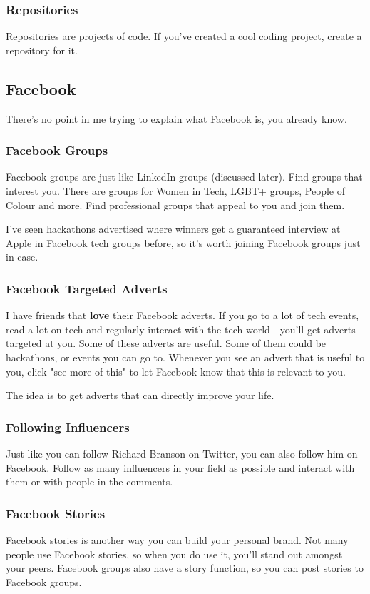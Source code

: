 \documentclass{article}
\begin{document}
\subsubsection{Repositories}
Repositories are projects of code. If you've created a cool coding
project, create a repository for it.
\subsection{Facebook}
There's no point in me trying to explain what Facebook is, you already
know.
\subsubsection{Facebook Groups}
Facebook groups are just like LinkedIn groups (discussed later). Find
groups that interest you. There are groups for Women in Tech, LGBT+
groups, People of Colour and more. Find professional groups that appeal
to you and join them.

I've seen hackathons advertised where winners get a guaranteed interview
at Apple in Facebook tech groups before, so it's worth joining Facebook
groups just in case.
\subsubsection{Facebook Targeted Adverts}
I have friends that \textbf{love} their Facebook adverts. If you go to a
lot of tech events, read a lot on tech and regularly interact with the
tech world - you'll get adverts targeted at you. Some of these adverts
are useful. Some of them could be hackathons, or events you can go to.
Whenever you see an advert that is useful to you, click "see more of
this" to let Facebook know that this is relevant to you.

The idea is to get adverts that can directly improve your life.
\subsubsection{Following Influencers}
Just like you can follow Richard Branson on Twitter, you can also follow
him on Facebook. Follow as many influencers in your field as possible
and interact with them or with people in the comments.
\subsubsection{Facebook Stories}
Facebook stories is another way you can build your personal brand. Not
many people use Facebook stories, so when you do use it, you'll stand
out amongst your peers. Facebook groups also have a story function, so
you can post stories to Facebook groups.
\end{document}
